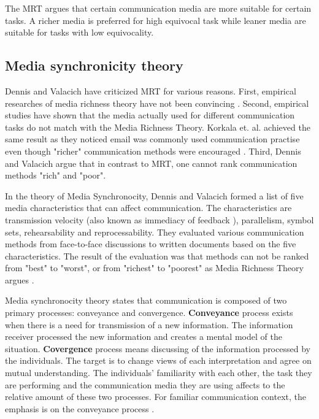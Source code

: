 \documentclass[conference]{IEEEtran}
\begin{document}
The MRT argues that certain communication media are more suitable for certain tasks. A richer media is preferred for high equivocal task while leaner media are suitable for tasks with low equivocality. 

\subsection{Media synchronicity theory}

Dennis and Valacich have criticized MRT for various reasons. First, empirical researches of media richness theory have not been convincing \cite{1998dennis} \cite{1997elshinnawy}. Second, empirical studies have shown that the media actually used for different communication tasks do not match with the Media Richness Theory. Korkala et. al. achieved the same result as they noticed email was commonly used communication practise even though "richer" communication methods were encouraged \cite{2006korkala}. Third, Dennis and Valacich argue that in contrast to MRT, one cannot rank communication methods "rich" and "poor". \cite{1999dennis}

In the theory of Media Synchronocity, Dennis and Valacich formed a list of five media characteristics that can affect communication. The characteristics are transmission velocity (also known as immediacy of feedback \cite{1999dennis}), parallelism, symbol sets, rehearsability and reprocessability. They evaluated various communication methods from face-to-face discussions to written documents based on the five characteristics. The result of the evaluation was that methods can not be ranked from "best" to "worst", or from "richest" to "poorest" as Media Richness Theory argues \cite{2008dennis}. 

Media synchronocity theory states that communication is composed of two primary processes: conveyance and convergence. \textbf{Conveyance} process exists when there is a need for transmission of a new information. The information receiver processed the new information and creates a mental model of the situation. \textbf{Covergence} process means discussing of the information processed by the individuals. The target is to change views of each interpretation and agree on mutual understanding. The individuals' familiarity with each other, the task they are performing and the communication media they are using affects to the relative amount of these two processes. For familiar communication context, the emphasis is on the conveyance process \cite{2008dennis}.
\end{document}

